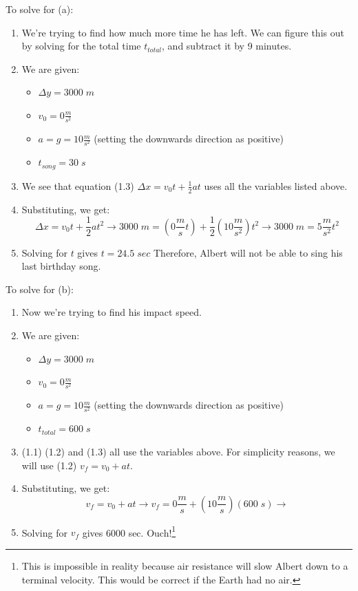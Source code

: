 \begin{solution}
To solve for (a):
\begin{enumerate}
    \item We're trying to find how much more time he has left. We can figure this out by solving for the total time $t_{total}$, and subtract it by 9 minutes.
    \item We are given:
    \begin{itemize}
        \item $\Delta y = 3000\;m$
        \item $v_0 = 0\frac{m}{s^2}$
        \item $a = g = 10\frac{m}{s^2}$ (setting the downwards direction as positive)
        \item $t_{song} = 30\;s$
    \end{itemize}
    \item We see that equation (1.3) $\Delta x = v_0t + \frac{1}{2}at$ uses all the variables listed above.
    \item Substituting, we get:
    \begin{equation*}
        \Delta x = v_0t + \frac{1}{2}at^2 \rightarrow
        3000\;m = (0\frac{m}{s}t)+\frac{1}{2}(10\frac{m}{s^2})t^2 \rightarrow
        3000\;m = 5\frac{m}{s^2}t^2
    \end{equation*}
    \item Solving for $t$ gives $t=24.5\;sec$ Therefore, Albert will not be able to sing his last birthday song.
\end{enumerate}
To solve for (b):
\begin{enumerate}
    \item Now we're trying to find his impact speed.
    \item We are given:
    \begin{itemize}
        \item $\Delta y = 3000\;m$
        \item $v_0 = 0\frac{m}{s^2}$
        \item $a = g = 10\frac{m}{s^2}$ (setting the downwards direction as positive)
        \item $t_{total} = 600\;s$
    \end{itemize}
    \item (1.1) (1.2) and (1.3) all use the variables above. For simplicity reasons, we will use (1.2) $v_f = v_0 + at$.
    \item Substituting, we get:
    \begin{equation*}
        v_f = v_0 + at \rightarrow
        v_f = 0\frac{m}{s} + (10\frac{m}{s})(600\;s) \rightarrow
    \end{equation*}
    \item Solving for $v_f$ gives 6000 sec. Ouch!\footnote{This is impossible in reality because air resistance will slow Albert down to a terminal velocity. This would be correct if the Earth had no air.}
\end{enumerate}
\end{solution}

